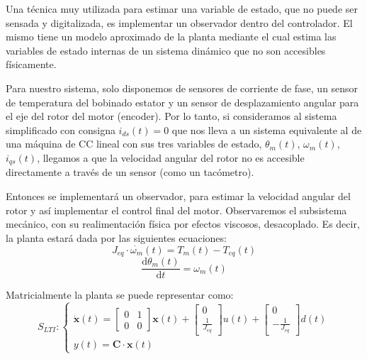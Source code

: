 \documentclass[10pt]{article}
\begin{document}
Una técnica muy utilizada para estimar una variable de estado, que no puede ser sensada y digitalizada, es implementar un observador dentro del controlador. El mismo tiene un modelo aproximado de la planta mediante el cual estima las variables de estado internas de un sistema dinámico que no son accesibles físicamente.
\par
Para nuestro sistema, solo disponemos de sensores de corriente de fase, un sensor de temperatura del bobinado estator y un sensor de desplazamiento angular para el eje del rotor del motor (encoder).
Por lo tanto, si consideramos al sistema simplificado con consigna $i_{ds}(t) = 0$ que nos lleva a un sistema equivalente al de una máquina de CC lineal con sus tres variables de estado, $\theta_m(t)$, $\omega_m(t)$, $i_{qs}(t)$, llegamos a que la velocidad angular del rotor no es accesible directamente a través de un sensor (como un tacómetro).
\par
Entonces se implementará un observador, para estimar la velocidad angular del rotor y así implementar el control final del motor.
Observaremos el subsistema mecánico, con su realimentación física por efectos viscosos, desacoplado.
Es decir, la planta estará dada por las siguientes ecuaciones:
\begin{equation}
	J_{eq}\cdot \dot{\omega_m}(t) = T_m(t) − T_{eq}(t)
\end{equation}
\begin{equation}
	\frac{\mathrm{d} \theta_m(t)}{\mathrm{d} t}=\omega_m(t)
\end{equation}

Matricialmente la planta se puede representar como:
\begin{equation}
	S_{LTI}:
	\begin{cases}
		\dot{\textbf{x}}(t) = 
		\begin{bmatrix}
		0 & 1 \\ 
		0 & 0
		\end{bmatrix} \textbf{x}(t) + 
		\begin{bmatrix}
			0  \\ 
			\frac{1}{J_{eq}} 
		\end{bmatrix}
		u(t) + 
		\begin{bmatrix}
			0  \\ 
			-\frac{1}{J_{eq}} 
		\end{bmatrix}
		d(t)
		\\
		y(t)= \textbf{C}\cdot \textbf{x}(t)
	\end{cases}
\end{equation}
\end{document}
